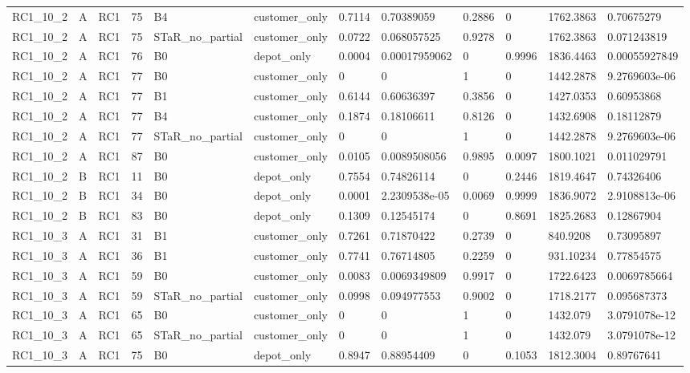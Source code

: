 \begin{longtable}{llllllllllll}
RC1\_10\_2 & A & RC1 & 75 & B4 & customer\_only & 0.7114 & 0.70389059 & 0.2886 & 0 & 1762.3863 & 0.70675279 \\
RC1\_10\_2 & A & RC1 & 75 & STaR\_no\_partial & customer\_only & 0.0722 & 0.068057525 & 0.9278 & 0 & 1762.3863 & 0.071243819 \\
RC1\_10\_2 & A & RC1 & 76 & B0 & depot\_only & 0.0004 & 0.00017959062 & 0 & 0.9996 & 1836.4463 & 0.00055927849 \\
RC1\_10\_2 & A & RC1 & 77 & B0 & customer\_only & 0 & 0 & 1 & 0 & 1442.2878 & 9.2769603e-06 \\
RC1\_10\_2 & A & RC1 & 77 & B1 & customer\_only & 0.6144 & 0.60636397 & 0.3856 & 0 & 1427.0353 & 0.60953868 \\
RC1\_10\_2 & A & RC1 & 77 & B4 & customer\_only & 0.1874 & 0.18106611 & 0.8126 & 0 & 1432.6908 & 0.18112879 \\
RC1\_10\_2 & A & RC1 & 77 & STaR\_no\_partial & customer\_only & 0 & 0 & 1 & 0 & 1442.2878 & 9.2769603e-06 \\
RC1\_10\_2 & A & RC1 & 87 & B0 & customer\_only & 0.0105 & 0.0089508056 & 0.9895 & 0.0097 & 1800.1021 & 0.011029791 \\
RC1\_10\_2 & B & RC1 & 11 & B0 & depot\_only & 0.7554 & 0.74826114 & 0 & 0.2446 & 1819.4647 & 0.74326406 \\
RC1\_10\_2 & B & RC1 & 34 & B0 & depot\_only & 0.0001 & 2.2309538e-05 & 0.0069 & 0.9999 & 1836.9072 & 2.9108813e-06 \\
RC1\_10\_2 & B & RC1 & 83 & B0 & depot\_only & 0.1309 & 0.12545174 & 0 & 0.8691 & 1825.2683 & 0.12867904 \\
RC1\_10\_3 & A & RC1 & 31 & B1 & customer\_only & 0.7261 & 0.71870422 & 0.2739 & 0 & 840.9208 & 0.73095897 \\
RC1\_10\_3 & A & RC1 & 36 & B1 & customer\_only & 0.7741 & 0.76714805 & 0.2259 & 0 & 931.10234 & 0.77854575 \\
RC1\_10\_3 & A & RC1 & 59 & B0 & customer\_only & 0.0083 & 0.0069349809 & 0.9917 & 0 & 1722.6423 & 0.0069785664 \\
RC1\_10\_3 & A & RC1 & 59 & STaR\_no\_partial & customer\_only & 0.0998 & 0.094977553 & 0.9002 & 0 & 1718.2177 & 0.095687373 \\
RC1\_10\_3 & A & RC1 & 65 & B0 & customer\_only & 0 & 0 & 1 & 0 & 1432.079 & 3.0791078e-12 \\
RC1\_10\_3 & A & RC1 & 65 & STaR\_no\_partial & customer\_only & 0 & 0 & 1 & 0 & 1432.079 & 3.0791078e-12 \\
RC1\_10\_3 & A & RC1 & 75 & B0 & depot\_only & 0.8947 & 0.88954409 & 0 & 0.1053 & 1812.3004 & 0.89767641 \\

\end{longtable}
